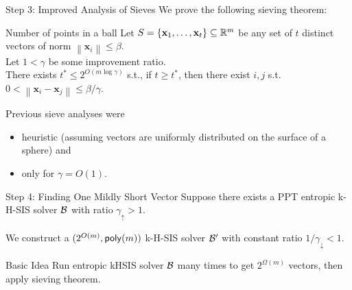 \documentclass[xcolor=table,10pt,aspectratio=169]{beamer}
\renewcommand{\vec}[1]{\ensuremath{\mathbf{#1}}\xspace}
\newcommand{\norm}[1]{\left\lVert#1\right\rVert}
\newcommand{\growthfactor}{\gamma_{\uparrow}}
\newcommand{\shrinkfactor}{\gamma_{\downarrow}}
\newcommand{\combinedfactor}{\gamma}
\begin{document}
\begin{frame}[label={sec:org01e247f}]{Step 3: Improved Analysis of Sieves}
We prove the following sieving theorem:

\begin{alertblock}{Number of points in a ball}
Let \(S = \set{\vec{x}_1, \ldots, \vec{x}_t} \subseteq \RR^m\) be any set of \(t\) distinct vectors of norm \(\norm{\vec{x}_i} \leq \beta\).\\[0pt]
Let \(1 < \combinedfactor\) be some improvement ratio.\\[0pt]
There exists \(t^* \leq 2^{O(m \log \combinedfactor)}\) s.t., if \(t \geq t^*\), then there exist \(i,j\) s.t. \(0 < \norm{\vec{x}_i - \vec{x}_j} \leq \beta/\combinedfactor\).
\end{alertblock}

Previous sieve analyses were
\begin{itemize}
\item heuristic (assuming vectors are uniformly distributed on the surface of a sphere) and
\item only for \(\combinedfactor = O(1)\).
\end{itemize}
\end{frame}

\begin{frame}[label={sec:org1bf803f}]{Step 4: Finding One Mildly Short Vector}
Suppose there exists a PPT entropic k-H-SIS solver \(\mathcal{B}\) with ratio \(\growthfactor > 1\).

We construct a \((2^{O(m)},\poly[m])\) k-H-SIS solver \(\mathcal{B}'\) with constant ratio \(1/\shrinkfactor < 1\).

\begin{alertblock}{Basic Idea}
Run entropic kHSIS solver \(\mathcal{B}\) many times to get \(2^{\Omega(m)}\) vectors, then apply sieving theorem.
\end{alertblock}
\end{frame}
\end{document}
